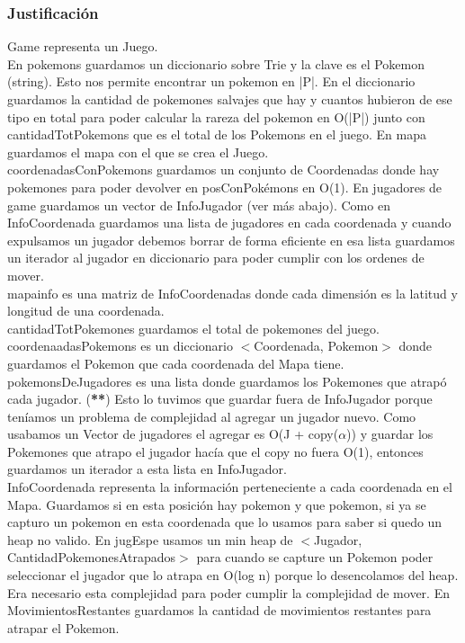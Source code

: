 \begin{Representacion}

\subsubsection{Justificación}
Game representa un Juego.\\
En pokemons guardamos un diccionario sobre Trie y la clave es el Pokemon (string). Esto nos permite encontrar un pokemon en |P|. En el diccionario guardamos la cantidad de pokemones salvajes que hay y cuantos hubieron de ese tipo en total para poder calcular la rareza del pokemon en O(|P|) junto con cantidadTotPokemons que es el total de los Pokemons en el juego.
En mapa guardamos el mapa con el que se crea el Juego.\\
coordenadasConPokemons guardamos un conjunto de Coordenadas donde hay pokemones para poder devolver en posConPok\'emons en O(1).
En jugadores de game guardamos un vector de InfoJugador (ver m\'as abajo). Como en InfoCoordenada guardamos una lista de jugadores en cada coordenada y cuando expulsamos un jugador debemos borrar de forma eficiente en esa lista guardamos un iterador al jugador en diccionario para poder cumplir con los ordenes de mover.\\
mapainfo es una matriz de InfoCoordenadas donde cada dimensi\'on es la latitud y longitud de una coordenada.\\
cantidadTotPokemones guardamos el total de pokemones del juego.\\
coordenaadasPokemons es un diccionario $<$Coordenada, Pokemon$>$ donde guardamos el Pokemon que cada coordenada del Mapa tiene.\\
pokemonsDeJugadores es una lista donde guardamos los Pokemones que atrapó cada jugador. (\textbf{**}) Esto lo tuvimos que guardar fuera de InfoJugador porque ten\'iamos un problema de complejidad al agregar un jugador nuevo. Como usabamos un Vector de jugadores el agregar es O(J + copy($\alpha$)) y guardar los Pokemones que atrapo el jugador hacía que el copy no fuera O(1), entonces guardamos un iterador a esta lista en InfoJugador.\\
InfoCoordenada representa la informaci\'on perteneciente a cada coordenada en el Mapa. Guardamos si en esta posici\'on hay pokemon y que pokemon, si ya se capturo un pokemon en esta coordenada que lo usamos para saber si quedo un heap no valido. En jugEspe usamos un min heap de $<$Jugador, CantidadPokemonesAtrapados$>$ para cuando se capture un Pokemon poder seleccionar el jugador que lo atrapa en O(log n) porque lo desencolamos del heap. Era necesario esta complejidad para poder cumplir la complejidad de mover. En MovimientosRestantes guardamos la cantidad de movimientos restantes para atrapar el Pokemon.\\

\end{Representacion}

